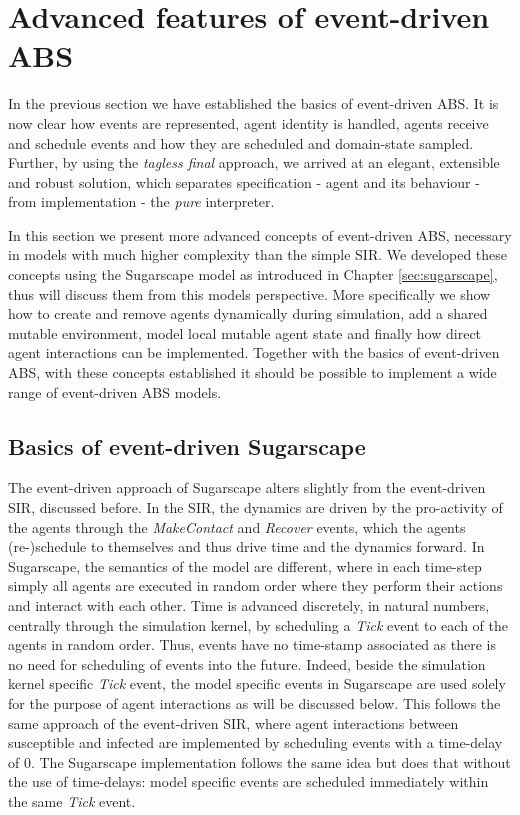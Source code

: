 \section{Advanced features of event-driven ABS}
In the previous section we have established the basics of event-driven ABS. It is now clear how events are represented, agent identity is handled, agents receive and schedule events and how they are scheduled and domain-state sampled. Further, by using the \textit{tagless final} approach, we arrived at an elegant, extensible and robust solution, which separates specification - agent and its behaviour - from implementation - the \textit{pure} interpreter. 

In this section we present more advanced concepts of event-driven ABS, necessary in models with much higher complexity than the simple SIR. We developed these concepts using the Sugarscape model as introduced in Chapter \ref{sec:sugarscape}, thus will discuss them from this models perspective. More specifically we show how to create and remove agents dynamically during simulation, add a shared mutable environment, model local mutable agent state and finally how direct agent interactions can be implemented. Together with the basics of event-driven ABS, with these concepts established it should be possible to implement a wide range of event-driven ABS models.

\subsection{Basics of event-driven Sugarscape}
The event-driven approach of Sugarscape alters slightly from the event-driven SIR, discussed before. In the SIR, the dynamics are driven by the pro-activity of the agents through the \textit{MakeContact} and \textit{Recover} events, which the agents (re-)schedule to themselves and thus drive time and the dynamics forward. In Sugarscape, the semantics of the model are different, where in each time-step simply all agents are executed in random order where they perform their actions and interact with each other. Time is advanced discretely, in natural numbers, centrally through the simulation kernel, by scheduling a \textit{Tick} event to each of the agents in random order. Thus, events have no time-stamp associated as there is no need for scheduling of events into the future. Indeed, beside the simulation kernel specific \textit{Tick} event, the model specific events in Sugarscape are used solely for the purpose of agent interactions as will be discussed below. This follows the same approach of the event-driven SIR, where agent interactions between susceptible and infected are implemented by scheduling events with a time-delay of 0. The Sugarscape implementation follows the same idea but does that without the use of time-delays: model specific events are scheduled immediately within the same \textit{Tick} event.

